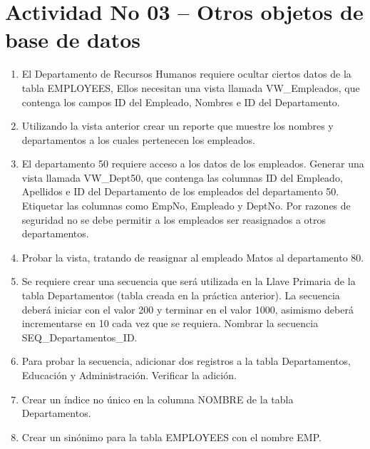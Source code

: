\section{Actividad No 03 –  Otros objetos de base de datos} 
		
\begin{enumerate}[1.]
	\item El Departamento de Recursos Humanos requiere ocultar ciertos datos de la tabla EMPLOYEES, Ellos necesitan una vista llamada VW\_Empleados, que contenga los campos ID del Empleado, Nombres e ID del Departamento.
	\item Utilizando la vista anterior crear un reporte que muestre los nombres y departamentos a los cuales
pertenecen los empleados.
	\item El departamento 50 requiere acceso a los datos de los empleados. Generar una vista llamada VW\_Dept50, que contenga las columnas ID del Empleado, Apellidos e ID del Departamento de los empleados del departamento 50. Etiquetar las columnas como EmpNo, Empleado y DeptNo. Por razones de seguridad no se debe permitir a los empleados ser reasignados a otros departamentos.
	\item Probar la vista, tratando de reasignar al empleado Matos al departamento 80.
	\item Se requiere crear una secuencia que será utilizada en la Llave Primaria de la tabla Departamentos (tabla creada en la práctica anterior). La secuencia deberá iniciar con el valor 200 y terminar en el valor 1000, asimismo deberá incrementarse en 10 cada vez que se requiera. Nombrar la secuencia SEQ\_Departamentos\_ID.
	\item Para probar la secuencia, adicionar dos registros a la tabla Departamentos, Educación y Administración. Verificar la adición.
	\item Crear un índice no único en la columna NOMBRE de la tabla Departamentos.
	\item Crear un sinónimo para la tabla EMPLOYEES con el nombre EMP.
\end{enumerate}

